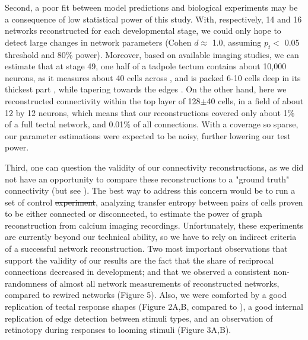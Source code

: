 \documentclass{article}
\providecommand{\DIFaddtex}[1]{{\protect\color{blue}{#1}}} %
\providecommand{\DIFdeltex}[1]{{\protect\color{red}\sout{#1}}}                      %
\providecommand{\DIFaddbegin}{} %
\providecommand{\DIFaddend}{} %
\providecommand{\DIFdelbegin}{} %
\providecommand{\DIFdelend}{} %
\providecommand{\DIFadd}[1]{\texorpdfstring{\DIFaddtex{#1}}{#1}} %
\providecommand{\DIFdel}[1]{\texorpdfstring{\DIFdeltex{#1}}{}} %
\newcommand{\DIFscaledelfig}{0.5}
\newlength{\DIFdelgraphicswidth} %
\newlength{\DIFdelgraphicsheight} %
\newcommand{\DIFaddincludegraphics}[2][]{{\color{blue}\fbox{\DIFOincludegraphics[#1]{#2}}}} %
\newcommand{\DIFdelincludegraphics}[2][]{%
\sbox{\DIFdelgraphicsbox}{\DIFOincludegraphics[#1]{#2}}%
\settoboxwidth{\DIFdelgraphicswidth}{\DIFdelgraphicsbox} %
\settoboxtotalheight{\DIFdelgraphicsheight}{\DIFdelgraphicsbox} %
\scalebox{\DIFscaledelfig}{%
\parbox[b]{\DIFdelgraphicswidth}{\usebox{\DIFdelgraphicsbox}\\[-\baselineskip] \rule{\DIFdelgraphicswidth}{0em}}\llap{\resizebox{\DIFdelgraphicswidth}{\DIFdelgraphicsheight}{%
\setlength{\unitlength}{\DIFdelgraphicswidth}%
\begin{picture}(1,1)%
\thicklines\linethickness{2pt} %
{\color[rgb]{1,0,0}\put(0,0){\framebox(1,1){}}}%
{\color[rgb]{1,0,0}\put(0,0){\line( 1,1){1}}}%
{\color[rgb]{1,0,0}\put(0,1){\line(1,-1){1}}}%
\end{picture}%
}\hspace*{3pt}}} %
} %
\DeclareRobustCommand{\DIFaddbegin}{\DIFOaddbegin \let\includegraphics\DIFaddincludegraphics} %
\DeclareRobustCommand{\DIFaddend}{\DIFOaddend \let\includegraphics\DIFOincludegraphics} %
\DeclareRobustCommand{\DIFdelbegin}{\DIFOdelbegin \let\includegraphics\DIFdelincludegraphics} %
\DeclareRobustCommand{\DIFdelend}{\DIFOaddend \let\includegraphics\DIFOincludegraphics} %
\begin{document}
Second, a poor fit between model predictions and biological experiments may be a consequence of low statistical power of this study. With, respectively, 14 and 16 networks reconstructed for each developmental stage, we could only hope to detect large changes in network parameters (Cohen $d \approx$ 1.0, assuming $p_t<$ 0.05 threshold and 80\% power). Moreover, based on available imaging studies, we can estimate that at stage 49, one half of a tadpole tectum contains about 10,000 neurons, as it measures about 40 cells across \citep{hiramoto2009}, and is packed 6-10 cells deep in its thickest part \citep{hewapathirane2008vivo}, while tapering towards the edges \citep{bollmann2009}. On the other hand, here we reconstructed connectivity within the top layer of 128$\pm$40 cells, in a field of about 12 by 12 neurons, which means that our reconstructions covered only about 1\% of a full tectal network, and 0.01\% of all connections. With a coverage so sparse, our parameter estimations were expected to be noisy, further lowering our test power.

Third, one can question the validity of our connectivity reconstructions, as we did not have an opportunity to compare these reconstructions to a "ground truth" connectivity (but see \citealt{xu2011}). The best way to address this concern would be to run a set of control \DIFdelbegin \DIFdel{experiment}\DIFdelend \DIFaddbegin \DIFadd{experiments}\DIFaddend , analyzing transfer entropy between pairs of cells proven to be either connected or disconnected, to estimate the power of graph reconstruction from calcium imaging recordings. Unfortunately, these experiments are currently beyond our technical ability, so we have to rely on indirect criteria of a successful network reconstruction. Two most important observations that support the validity of our results are the fact that the share of reciprocal connections decreased in development; and that we observed a consistent non-randomness of almost all network measurements of reconstructed networks, compared to rewired networks (Figure 5). Also, we were comforted by a good replication of tectal response shapes (Figure 2A,B, compared to \citealt{khakhalin2014}), a good internal replication of edge detection between stimuli types, and an observation of retinotopy during responses to looming stimuli (Figure 3A,B).

\DIFdelbegin %
\end{document}
